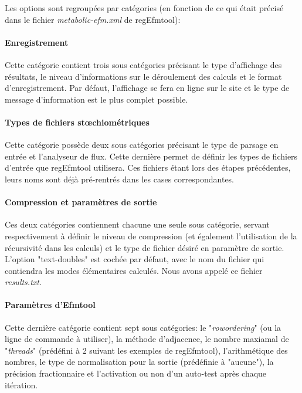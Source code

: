 Les options sont regroupées par catégories (en fonction de ce qui était précisé dans le fichier \textit{metabolic-efm.xml} de regEfmtool):

\paragraph*{Enregistrement} Cette catégorie contient trois sous catégories précisant le type d'affichage des résultats, le niveau d'informations sur le déroulement des calculs et le format d'enregistrement. Par défaut, l'affichage se fera en ligne sur le site et le type de message d'information est le plus complet possible. 

\paragraph*{Types de fichiers stœchiométriques} Cette catégorie possède deux sous catégories précisant le type de parsage en entrée et l'analyseur de flux. Cette dernière permet de définir les types de fichiers d'entrée que regEfmtool utilisera. Ces fichiers étant lors des étapes précédentes, leurs noms sont déjà pré-rentrés dans les cases correspondantes.

\paragraph*{Compression et paramètres de sortie} Ces deux catégories contiennent chacune une seule sous catégorie, servant respectivement à définir le niveau de compression (et également l'utilisation de la récursivité dans les calculs) et le type de fichier désiré en paramètre de sortie. L'option "text-doubles" est cochée par défaut, avec le nom du fichier qui contiendra les modes élémentaires calculés. Nous avons appelé ce fichier \textit{results.txt}. 

\paragraph*{Paramètres d'Efmtool} Cette dernière catégorie contient sept sous catégories: le "\textit{rowordering}" (ou la ligne de commande à utiliser), la méthode d'adjacence, le nombre maxiamal de "\textit{threads}" (prédéfini à 2 suivant les exemples de regEfmtool), l'arithmétique des nombres, le type de normalisation pour la sortie (prédéfinie à "aucune"), la précision fractionnaire et l'activation ou non d'un auto-test après chaque itération. \\

